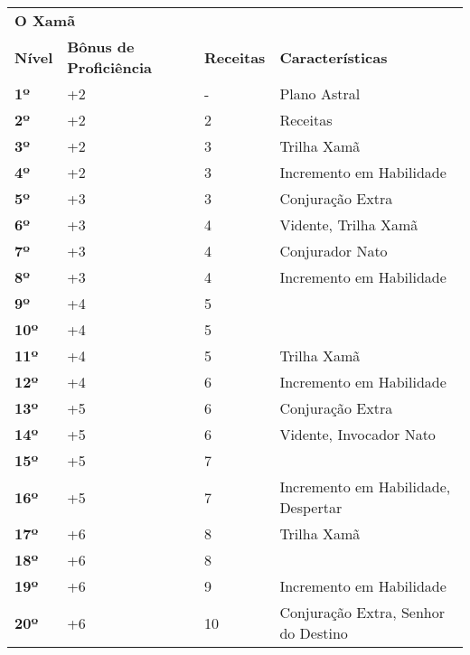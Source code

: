 \begin{center}
\begin{tabular}{
        | b{8mm}<{\centering}
        b{23mm}<{\centering}
        b{18mm}<{\centering}
        p{70mm}<{\raggedright\arraybackslash} |
}
    \hline

    \multicolumn{4}{|l|}{\textbf{\Large O Xamã}} \\

    \textbf{Nível} & \textbf{Bônus de Proficiência} & \textbf{Receitas} &
    \textbf{Características} \\
    \hline \hline

    \textbf{1º} & +2 & - & Plano Astral \\
    \hline
    \textbf{2º} & +2 & 2 & Receitas \\
    \hline
    \textbf{3º} & +2 & 3 & Trilha Xamã \\
    \hline
    \textbf{4º} & +2 & 3 & Incremento em Habilidade \\
    \hline
    \textbf{5º} & +3 & 3 & Conjuração Extra \\
    \hline
    \textbf{6º} & +3 & 4 & Vidente, Trilha Xamã \\
    \hline
    \textbf{7º} & +3 & 4 & Conjurador Nato \\
    \hline
    \textbf{8º} & +3 & 4 & Incremento em Habilidade \\
    \hline
    \textbf{9º} & +4 & 5 & \\
    \hline
    \textbf{10º} & +4 & 5 & \\
    \hline
    \textbf{11º} & +4 & 5 & Trilha Xamã \\
    \hline
    \textbf{12º} & +4 & 6 & Incremento em Habilidade \\
    \hline
    \textbf{13º} & +5 & 6 & Conjuração Extra \\
    \hline
    \textbf{14º} & +5 & 6 & Vidente, Invocador Nato \\
    \hline
    \textbf{15º} & +5 & 7 & \\
    \hline
    \textbf{16º} & +5 & 7 & Incremento em Habilidade, Despertar \\
    \hline
    \textbf{17º} & +6 & 8 & Trilha Xamã \\
    \hline
    \textbf{18º} & +6 & 8 & \\
    \hline
    \textbf{19º} & +6 & 9 & Incremento em Habilidade \\
    \hline
    \textbf{20º} & +6 & 10 & Conjuração Extra, Senhor do Destino \\
    \hline
\end{tabular}
\end{center}
